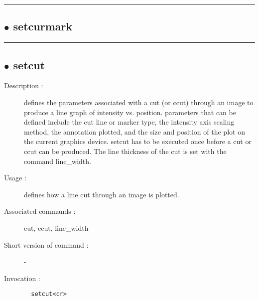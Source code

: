 \hrule \subsection*{$\bullet$ setcurmark}

\hrule \subsection*{$\bullet$ setcut}
\begin{description}
\item[Description :] defines the parameters associated with a cut (or ccut) through
an image to produce a line graph of intensity vs. position.  parameters
that can be defined include the cut line or marker type, the intensity
axis scaling method, the annotation plotted, and the size and position of
the plot on the current graphics device.  setcut has to be executed once
before a cut or ccut can be produced.  The line thickness of the cut is
set with the command line\_width.
\item[Usage :] defines how a line cut through an image is plotted.
\item[Associated commands :] cut, ccut, line\_width
\item[Short version of command :] -
\item[Invocation :]

\verb+  setcut<cr> +\end{description}

